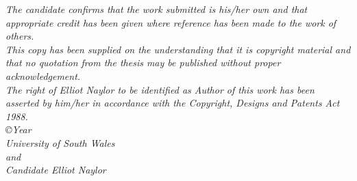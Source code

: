 \cleardoublepage
\begin{center}
\textit{
The candidate confirms that the work submitted is his/her own and that appropriate credit has been given where reference has been made to the work of others.\\
\hfill\break
This copy has been supplied on the understanding that it is copyright material and that no quotation from the thesis may be published without proper acknowledgement.\\
\hfill\break
The right of Elliot Naylor to be identified as Author of this work has been asserted by him/her in accordance with the Copyright, Designs and Patents Act 1988.\\
\vfill
\copyright Year\\ University of South Wales\\ and\\ Candidate Elliot Naylor
}
\end{center}

